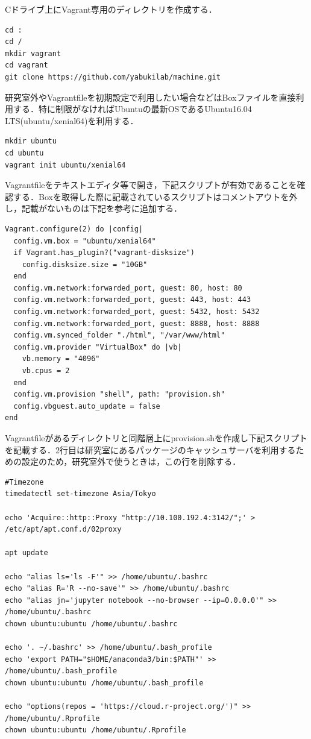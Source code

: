 Cドライブ上にVagrant専用のディレクトリを作成する．
\begin{verbatim}
cd :
cd /
mkdir vagrant
cd vagrant
git clone https://github.com/yabukilab/machine.git
\end{verbatim}

研究室外やVagrantfileを初期設定で利用したい場合などはBoxファイルを直接利用する．特に制限がなければUbuntuの最新OSであるUbuntu16.04 LTS(ubuntu/xenial64)を利用する．

\begin{verbatim}
mkdir ubuntu
cd ubuntu
vagrant init ubuntu/xenial64
\end{verbatim}

\newpage

Vagrantfileをテキストエディタ等で開き，下記スクリプトが有効であることを確認する．Boxを取得した際に記載されているスクリプトはコメントアウトを外し，記載がないものは下記を参考に追加する．

\begin{verbatim}
Vagrant.configure(2) do |config|
  config.vm.box = "ubuntu/xenial64"
  if Vagrant.has_plugin?("vagrant-disksize")
    config.disksize.size = "10GB"
  end
  config.vm.network:forwarded_port, guest: 80, host: 80
  config.vm.network:forwarded_port, guest: 443, host: 443
  config.vm.network:forwarded_port, guest: 5432, host: 5432
  config.vm.network:forwarded_port, guest: 8888, host: 8888
  config.vm.synced_folder "./html", "/var/www/html"
  config.vm.provider "VirtualBox" do |vb|
    vb.memory = "4096"
    vb.cpus = 2
  end
  config.vm.provision "shell", path: "provision.sh"
  config.vbguest.auto_update = false
end
\end{verbatim}

\newpage

Vagrantfileがあるディレクトリと同階層上にprovision.shを作成し下記スクリプトを記載する．2行目は研究室にあるパッケージのキャッシュサーバを利用するための設定のため，研究室外で使うときは，この行を削除する．

\begin{verbatim}
#Timezone
timedatectl set-timezone Asia/Tokyo

echo 'Acquire::http::Proxy "http://10.100.192.4:3142/";' > 
/etc/apt/apt.conf.d/02proxy

apt update

echo "alias ls='ls -F'" >> /home/ubuntu/.bashrc
echo "alias R='R --no-save'" >> /home/ubuntu/.bashrc
echo "alias jn='jupyter notebook --no-browser --ip=0.0.0.0'" >> 
/home/ubuntu/.bashrc
chown ubuntu:ubuntu /home/ubuntu/.bashrc

echo '. ~/.bashrc' >> /home/ubuntu/.bash_profile
echo 'export PATH="$HOME/anaconda3/bin:$PATH"' >> 
/home/ubuntu/.bash_profile
chown ubuntu:ubuntu /home/ubuntu/.bash_profile

echo "options(repos = 'https://cloud.r-project.org/')" >> 
/home/ubuntu/.Rprofile
chown ubuntu:ubuntu /home/ubuntu/.Rprofile
\end{verbatim}

